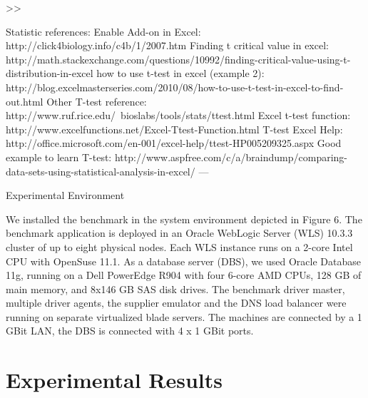 \documentclass[runningheads,a4paper]{llncs}
\begin{document}
>>

Statistic references:
Enable Add-on in Excel: http://click4biology.info/c4b/1/2007.htm
Finding t critical value in excel: http://math.stackexchange.com/questions/10992/finding-critical-value-using-t-distribution-in-excel
how to use t-test in excel (example 2): http://blog.excelmasterseries.com/2010/08/how-to-use-t-test-in-excel-to-find-out.html
Other T-test reference: http://www.ruf.rice.edu/~bioslabs/tools/stats/ttest.html
Excel t-test function: http://www.excelfunctions.net/Excel-Ttest-Function.html
T-test Excel Help: http://office.microsoft.com/en-001/excel-help/ttest-HP005209325.aspx
Good example to learn T-test: http://www.aspfree.com/c/a/braindump/comparing-data-sets-using-statistical-analysis-in-excel/
---

Experimental Environment

We installed the benchmark in the system environment depicted in Figure 6. The
benchmark application is deployed in an Oracle WebLogic Server (WLS) 10.3.3 cluster of up to eight 
physical nodes. Each WLS instance runs on a 2-core Intel CPU with OpenSuse 11.1. As a database 
server (DBS), we used Oracle Database 11g, running on a Dell PowerEdge R904 with four 6-core AMD 
CPUs, 128 GB of main memory, and 8x146 GB SAS disk drives. The benchmark driver master, multiple 
driver agents, the supplier emulator and the DNS load balancer were running on separate 
virtualized blade servers. The machines are connected by a 1 GBit LAN, the DBS is connected with 
4 x 1 GBit ports.


\section{Experimental Results}


\end{document}
